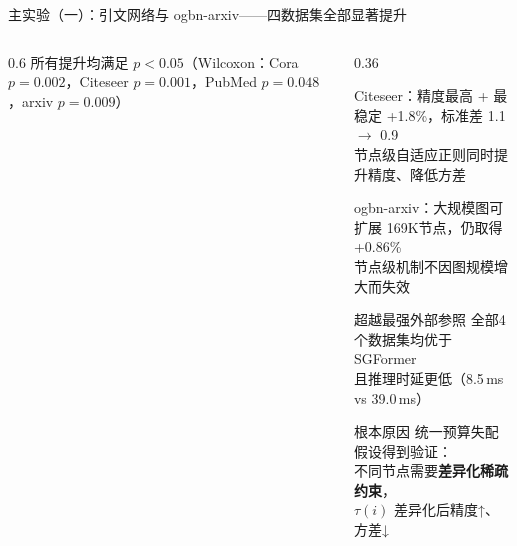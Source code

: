 \documentclass[aspectratio=169,9pt,xcolor=dvipsnames]{beamer}
\newcommand{\green}[1]{\textcolor{mygreen}{#1}}
\begin{document}
\begin{frame}{主实验（一）：引文网络与 ogbn-arxiv——四数据集全部显著提升}
\begin{columns}[T]
\begin{column}{0.6\textwidth}
\vspace{0.2cm}
  所有提升均满足 $p<0.05$（Wilcoxon：Cora $p\!=\!0.002$，Citeseer $p\!=\!0.001$，PubMed $p\!=\!0.048$，arxiv $p\!=\!0.009$）
\end{column}
\hfill
\begin{column}{0.36\textwidth}
  \begin{block}{Citeseer：精度最高 + 最稳定}
    \green{+1.8\%}，标准差 1.1 $\to$ 0.9\\
    节点级自适应正则同时提升精度、降低方差
  \end{block}

  \medskip
  \begin{block}{ogbn-arxiv：大规模图可扩展}
    169K节点，仍取得 \green{+0.86\%}\\
    节点级机制不因图规模增大而失效
  \end{block}

  \medskip
  \begin{block}{超越最强外部参照}
    全部4个数据集均优于 SGFormer\\
    且推理时延更低（8.5\,ms vs 39.0\,ms）
  \end{block}

  \medskip
  \begin{alertblock}{根本原因}
    统一预算失配假设得到验证：\\
    不同节点需要\textbf{差异化稀疏约束}，\\
    $\tau(i)$ 差异化后精度↑、方差↓
  \end{alertblock}
\end{column}
\end{columns}
\end{frame}
\end{document}

